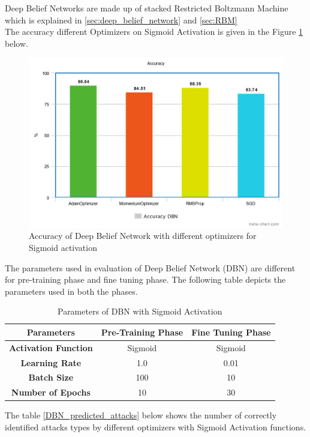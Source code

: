 \documentclass[12pt, a4paper]{report}
\begin{document}
Deep Belief Networks are made up of stacked Restricted Boltzmann Machine which is explained in \ref{sec:deep_belief_network} and \ref{sec:RBM} \\ 
The accuracy different Optimizers on Sigmoid Activation is given in the Figure \ref{fig:dbn_accu_sigmoid} below.\\ \par
\begin{figure}[ht]
\centering
\captionsetup{justification=centering,margin=2cm}
\includegraphics[width=13cm]{DBN_accuracy_optimizer.png}
\caption{ Accuracy of Deep Belief Network with different optimizers for Sigmoid activation }
\label{fig:dbn_accu_sigmoid}
\end{figure}


The parameters used in evaluation of Deep Belief Network (DBN) are different for pre-training phase and fine tuning phase. The following table depicts the parameters used in both the phases.\\ \par

\begin{table}[ht]
\centering
\captionsetup{justification=centering,margin=2cm}
\begin{tabular}{|c|c|c|}
\hline
\textbf{Parameters}          & \textbf{Pre-Training Phase} & \textbf{Fine Tuning Phase} \\ \hline
\textbf{Activation Function} & Sigmoid                     & Sigmoid                    \\ \hline
\textbf{Learning Rate}       & 1.0                         & 0.01                        \\ \hline
\textbf{Batch Size}          & 100                         & 10                         \\ \hline
\textbf{Number of Epochs}    & 10                          & 30                         \\ \hline
\end{tabular}
\caption{Parameters of DBN with Sigmoid Activation}
\label{DBNSigmoidMomentum}
\end{table}
\clearpage
The table \ref{DBN_predicted_attacks} below shows the number of correctly identified attacks types by different optimizers with Sigmoid Activation functions.
\end{document}
